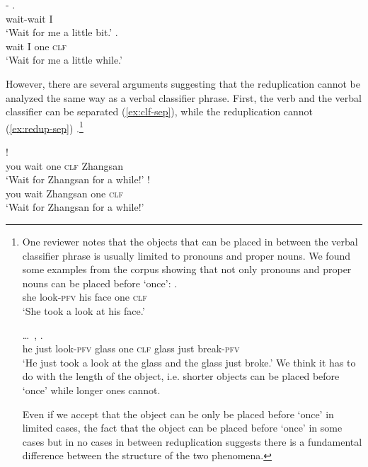 \ea\label{ex:redup-clf}
	\ea \gll {}- .\\
		wait-wait I\\
		\glt `Wait for me a little bit.'
	\ex \gll {}   .\\
	wait I one \textsc{clf}\\
	\glt `Wait for me a little while.'
	\z
\z

However, there are several arguments suggesting that the reduplication cannot be analyzed the same way as a verbal classifier phrase. First, the verb and the verbal classifier can be separated (\ref{ex:clf-sep}), while the reduplication cannot (\ref{ex:redup-sep}) \citep[269]{Paris2013}.\footnote{
One reviewer notes that the objects that can be placed in between the verbal classifier phrase is usually limited to pronouns and proper nouns.
We found some examples from the corpus showing that not only pronouns and proper nouns can be placed before   `once':
\ea%
\gll {}     .\\
she look-\textsc{pfv} his face one \textsc{clf}\\
\glt `She took a look at his face.'

\ex%
\gll {} \ldots\,     ,   .\\
he {} just look-\textsc{pfv} glass one \textsc{clf} glass just break-\textsc{pfv}\\
\glt `He just took a look at the glass and the glass just broke.'
\z
We think it has to do with the length of the object, i.e. shorter objects can be placed before    `once' while longer ones cannot.

Even if we accept that the object can be only be placed before    `once' in limited cases,
the fact that the object can be placed before    `once' in some cases but in no cases in between reduplication suggests there is a fundamental difference between the structure of the two phenomena.
}

\ea\label{ex:clf-sep}
  \ea \gll {}    !\\
   you wait one \textsc{clf} Zhangsan\\
   \glt `Wait for Zhangsan for a while!'
  \ex \gll {}    !\\
   you wait Zhangsan one \textsc{clf}\\
   \glt `Wait for Zhangsan for a while!'
\z
\z

